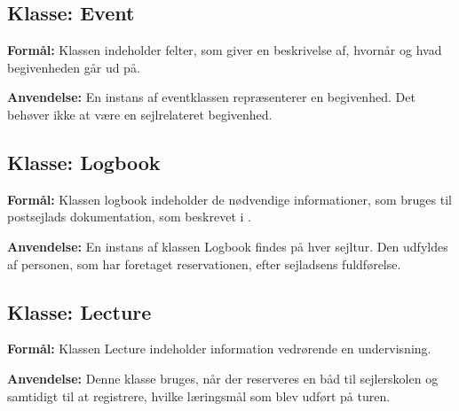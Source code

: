 \subsection*{Klasse: Event}

\textbf{Formål:} 
Klassen indeholder felter, som giver en beskrivelse af, hvornår og hvad begivenheden går ud på. 

\textbf{Anvendelse:}
En instans af eventklassen repræsenterer en begivenhed. 
Det behøver ikke at være en sejlrelateret begivenhed.

\subsection*{Klasse: Logbook}

\textbf{Formål:}
Klassen logbook indeholder de nødvendige informationer, som bruges til postsejlads dokumentation, som beskrevet i .

\textbf{Anvendelse:}
En instans af klassen Logbook findes på hver sejltur. 
Den udfyldes af personen, som har foretaget reservationen, efter sejladsens fuldførelse. 

\subsection*{Klasse: Lecture}

\textbf{Formål:}
Klassen Lecture indeholder information vedrørende en undervisning. 

\textbf{Anvendelse:}
Denne klasse bruges, når der reserveres en båd til sejlerskolen og samtidigt til at registrere, hvilke læringsmål som blev udført på turen. 

